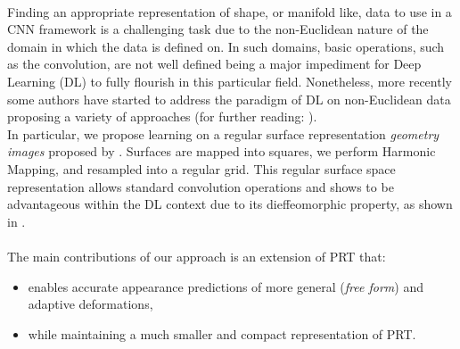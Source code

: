 \\
Finding an appropriate representation of shape, or manifold like, data to use in a CNN framework is a challenging task due to the non-Euclidean nature of the domain in which the data is defined on. In such domains, basic operations, such as the convolution, are not well defined being a major impediment for Deep Learning (DL) to fully flourish in this particular field. Nonetheless, more recently some authors have started to address the paradigm of DL on non-Euclidean data proposing a variety of approaches \cite{Masci2015ShapeNetCN, Geometric_deep_learning, CNN_on_Torus} (for further reading: \cite{GeoDeepLearning}). \\
In particular, we propose learning on a regular surface representation \textit{geometry images} proposed by \citep{gu2002geometry}. Surfaces are mapped into squares, we perform Harmonic Mapping, and resampled into a regular grid. This regular surface space representation allows standard convolution operations and shows to be advantageous within the DL context due to its dieffeomorphic property, as shown in \cite{sinha2016deep}. 
\\
\\
The main contributions of our approach is an extension of PRT that:
\begin{itemize}
\item enables accurate appearance predictions of more general (\textit{free form}) and adaptive deformations,
\item while maintaining a much smaller and compact representation of PRT. 
\end{itemize}
